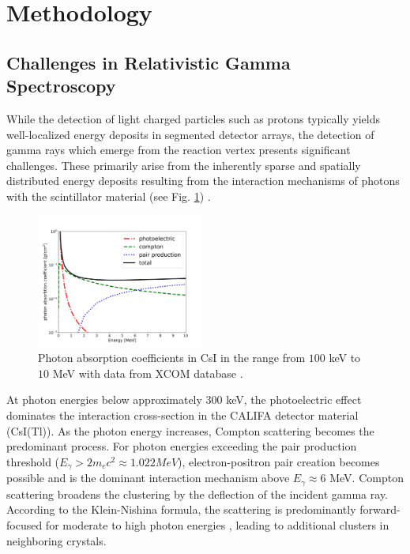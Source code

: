 \documentclass[review,sort&compress]{elsarticle}
\begin{document}
\section{Methodology}
\label{sec:metho}
\subsection{Challenges in Relativistic Gamma Spectroscopy}\label{s_sec:gamma_spec}
While the detection of light charged particles such as protons typically yields well-localized energy deposits in segmented detector arrays, the detection of gamma rays which emerge from the reaction vertex presents significant challenges. These primarily arise from the inherently sparse and spatially distributed energy deposits resulting from the interaction mechanisms of photons with the scintillator material (see Fig. \ref{fig:csi}) \cite{kolanoski2016teilchendetektoren}.\newline
\begin{figure}[!htb]
	\centering 
	\includegraphics[width=0.49\textwidth]{fig1.png}	
	\caption{Photon absorption coefficients in CsI in the range from $100$ keV to $10$ MeV with data from XCOM database \cite{seltzer2010xcom}.} 
	\label{fig:csi}%
\end{figure}
At photon energies below approximately $300$ keV, the photoelectric effect dominates the interaction cross-section in the CALIFA detector material (CsI(Tl)). As the photon energy increases, Compton scattering becomes the predominant process. For photon energies exceeding the pair production threshold ($E_{\gamma} > 2m_{e}c^2 \approx 1.022 MeV$), electron-positron pair creation becomes possible and is the dominant interaction mechanism above $E_{\gamma} \approx 6$ MeV.\newline
Compton scattering broadens the clustering by the deflection of the incident gamma ray. According to the Klein-Nishina formula, the scattering is predominantly forward-focused for moderate to high photon energies \cite{klein1929streuung}, leading to additional clusters in neighboring crystals.\newline
\end{document}
